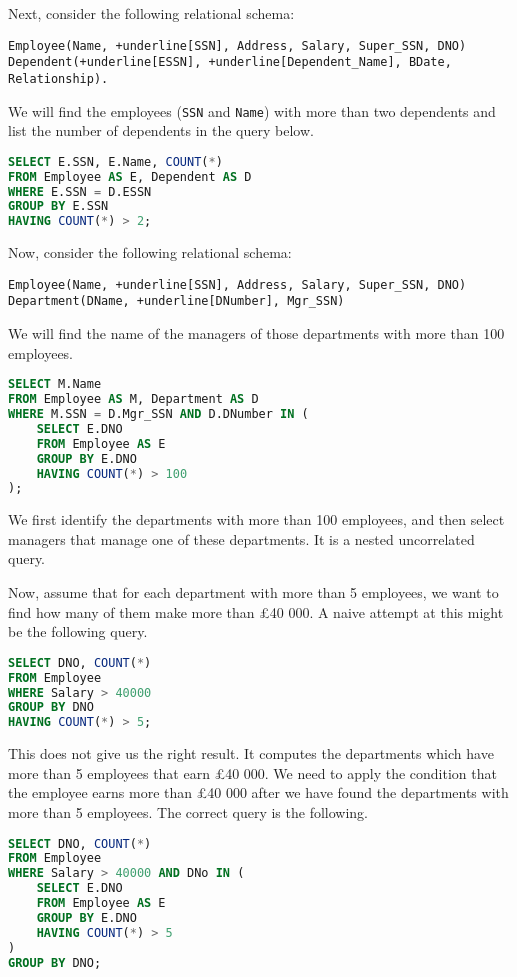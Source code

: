 \documentclass[a4paper, openany]{memoir}
\begin{document}
Next, consider the following relational schema:
\begin{Verbatim}[commandchars=+\[\]]
Employee(Name, +underline[SSN], Address, Salary, Super_SSN, DNO)
Dependent(+underline[ESSN], +underline[Dependent_Name], BDate, Relationship).
\end{Verbatim}
We will find the employees (\texttt{SSN} and \texttt{Name}) with more than two dependents and list the number of dependents in the query below.
\begin{lstlisting}[language=SQL]
SELECT E.SSN, E.Name, COUNT(*)
FROM Employee AS E, Dependent AS D
WHERE E.SSN = D.ESSN
GROUP BY E.SSN
HAVING COUNT(*) > 2;
\end{lstlisting}
\noindent Now, consider the following relational schema:
\begin{Verbatim}[commandchars=+\[\]]
Employee(Name, +underline[SSN], Address, Salary, Super_SSN, DNO)
Department(DName, +underline[DNumber], Mgr_SSN)
\end{Verbatim}
We will find the name of the managers of those departments with more than 100 employees.
\begin{lstlisting}[language=SQL]
SELECT M.Name
FROM Employee AS M, Department AS D
WHERE M.SSN = D.Mgr_SSN AND D.DNumber IN (
    SELECT E.DNO
    FROM Employee AS E
    GROUP BY E.DNO
    HAVING COUNT(*) > 100
);
\end{lstlisting}
We first identify the departments with more than 100 employees, and then select managers that manage one of these departments. It is a nested uncorrelated query.

Now, assume that for each department with more than 5 employees, we want to find how many of them make more than £40 000. A naive attempt at this might be the following query.
\begin{lstlisting}[language=SQL]
SELECT DNO, COUNT(*)
FROM Employee
WHERE Salary > 40000
GROUP BY DNO
HAVING COUNT(*) > 5;
\end{lstlisting}
This does not give us the right result. It computes the departments which have more than 5 employees that earn £40 000. We need to apply the condition that the employee earns more than £40 000 after we have found the departments with more than 5 employees. The correct query is the following.
\begin{lstlisting}[language=SQL]
SELECT DNO, COUNT(*)
FROM Employee
WHERE Salary > 40000 AND DNo IN (
    SELECT E.DNO
    FROM Employee AS E
    GROUP BY E.DNO
    HAVING COUNT(*) > 5
)
GROUP BY DNO;
\end{lstlisting}
\end{document}
